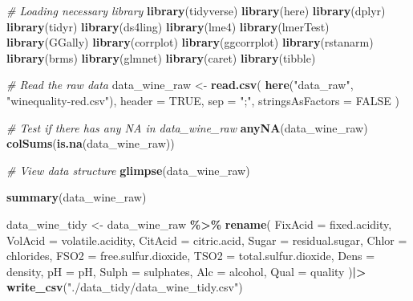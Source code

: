 \documentclass[
  doc,floatsintext]{apa6}
\newenvironment{Shaded}{\begin{snugshade}}{\end{snugshade}}
\newcommand{\AttributeTok}[1]{\textcolor[rgb]{0.13,0.29,0.53}{#1}}
\newcommand{\CommentTok}[1]{\textcolor[rgb]{0.56,0.35,0.01}{\textit{#1}}}
\newcommand{\ConstantTok}[1]{\textcolor[rgb]{0.56,0.35,0.01}{#1}}
\newcommand{\FunctionTok}[1]{\textcolor[rgb]{0.13,0.29,0.53}{\textbf{#1}}}
\newcommand{\NormalTok}[1]{#1}
\newcommand{\OtherTok}[1]{\textcolor[rgb]{0.56,0.35,0.01}{#1}}
\newcommand{\SpecialCharTok}[1]{\textcolor[rgb]{0.81,0.36,0.00}{\textbf{#1}}}
\newcommand{\StringTok}[1]{\textcolor[rgb]{0.31,0.60,0.02}{#1}}
\begin{document}
\begin{Shaded}
\begin{Highlighting}[]
\CommentTok{\# Loading necessary library}
\FunctionTok{library}\NormalTok{(tidyverse)}
\FunctionTok{library}\NormalTok{(here)}
\FunctionTok{library}\NormalTok{(dplyr)}
\FunctionTok{library}\NormalTok{(tidyr)}
\FunctionTok{library}\NormalTok{(ds4ling)}
\FunctionTok{library}\NormalTok{(lme4)}
\FunctionTok{library}\NormalTok{(lmerTest)}
\FunctionTok{library}\NormalTok{(GGally)}
\FunctionTok{library}\NormalTok{(corrplot)}
\FunctionTok{library}\NormalTok{(ggcorrplot)}
\FunctionTok{library}\NormalTok{(rstanarm)}
\FunctionTok{library}\NormalTok{(brms)}
\FunctionTok{library}\NormalTok{(glmnet)}
\FunctionTok{library}\NormalTok{(caret)}
\FunctionTok{library}\NormalTok{(tibble)}

\CommentTok{\# Read the raw data}
\NormalTok{data\_wine\_raw }\OtherTok{\textless{}{-}} \FunctionTok{read.csv}\NormalTok{(}
  \FunctionTok{here}\NormalTok{(}\StringTok{"data\_raw"}\NormalTok{, }\StringTok{"winequality{-}red.csv"}\NormalTok{),}
  \AttributeTok{header =} \ConstantTok{TRUE}\NormalTok{,}
  \AttributeTok{sep =} \StringTok{";"}\NormalTok{,}
  \AttributeTok{stringsAsFactors =} \ConstantTok{FALSE}
\NormalTok{)}

\CommentTok{\# Test if there has any NA in data\_wine\_raw}
\FunctionTok{anyNA}\NormalTok{(data\_wine\_raw)}
\FunctionTok{colSums}\NormalTok{(}\FunctionTok{is.na}\NormalTok{(data\_wine\_raw))}

\CommentTok{\# View data structure}
\FunctionTok{glimpse}\NormalTok{(data\_wine\_raw)}

\FunctionTok{summary}\NormalTok{(data\_wine\_raw)}

\NormalTok{data\_wine\_tidy }\OtherTok{\textless{}{-}}\NormalTok{ data\_wine\_raw }\SpecialCharTok{\%\textgreater{}\%}
  \FunctionTok{rename}\NormalTok{(}
    \AttributeTok{FixAcid =}\NormalTok{ fixed.acidity,}
    \AttributeTok{VolAcid =}\NormalTok{ volatile.acidity,}
    \AttributeTok{CitAcid =}\NormalTok{ citric.acid,}
    \AttributeTok{Sugar   =}\NormalTok{ residual.sugar,}
    \AttributeTok{Chlor   =}\NormalTok{ chlorides,}
    \AttributeTok{FSO2    =}\NormalTok{ free.sulfur.dioxide,}
    \AttributeTok{TSO2    =}\NormalTok{ total.sulfur.dioxide,}
    \AttributeTok{Dens    =}\NormalTok{ density,}
    \AttributeTok{pH      =}\NormalTok{ pH,}
    \AttributeTok{Sulph   =}\NormalTok{ sulphates,}
    \AttributeTok{Alc     =}\NormalTok{ alcohol,}
    \AttributeTok{Qual    =}\NormalTok{ quality}
\NormalTok{  )}\SpecialCharTok{|\textgreater{}}
  \FunctionTok{write\_csv}\NormalTok{(}\StringTok{"./data\_tidy/data\_wine\_tidy.csv"}\NormalTok{)}



\end{Highlighting}
\end{Shaded}
\end{document}
